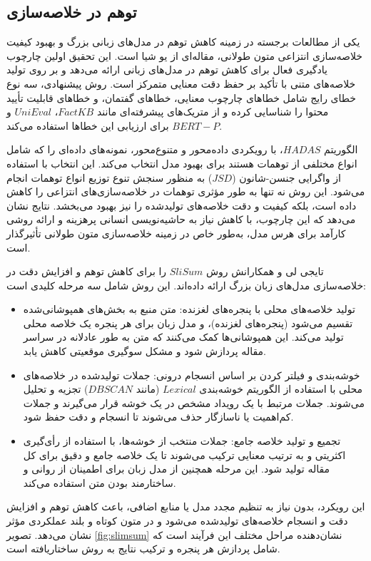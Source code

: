 \subsection{توهم در خلاصه‌سازی}
یکی از مطالعات برجسته در زمینه کاهش توهم در مدل‌های زبانی بزرگ  و بهبود کیفیت خلاصه‌سازی انتزاعی متون طولانی، مقاله‌ای از یو شیا است. این تحقیق اولین چارچوب یادگیری فعال برای کاهش توهم در مدل‌های زبانی ارائه می‌دهد و بر روی تولید خلاصه‌های متنی با تأکید بر حفظ دقت معنایی متمرکز است. روش پیشنهادی، سه نوع خطای رایج شامل خطاهای چارچوب معنایی، خطاهای گفتمان، و خطاهای قابلیت تأیید محتوا را شناسایی کرده و از متریک‌های پیشرفته‌ای مانند $FactKB$، $UniEval$ و$ BERT-P$ برای ارزیابی این خطاها استفاده می‌کند.

الگوریتم $HADAS$، با رویکردی داده‌محور و متنوع‌محور، نمونه‌های داده‌ای را که شامل انواع مختلفی از توهمات هستند برای بهبود مدل انتخاب می‌کند. این انتخاب با استفاده از واگرایی جنسن-شانون ($JSD$) به منظور سنجش تنوع توزیع انواع توهمات انجام می‌شود. این روش نه تنها به طور مؤثری توهمات در خلاصه‌سازی‌های انتزاعی را کاهش داده است، بلکه کیفیت و دقت خلاصه‌های تولیدشده را نیز بهبود می‌بخشد. نتایج نشان می‌دهد که این چارچوب، با کاهش نیاز به حاشیه‌نویسی انسانی پرهزینه و ارائه روشی کارآمد برای هرس مدل، به‌طور خاص در زمینه خلاصه‌سازی متون طولانی تأثیرگذار است\cite{xia2024hallucinationdiversityawareactivelearning}.


 تایجی لی و همکارانش روش $SliSum$ را برای کاهش توهم و افزایش دقت در خلاصه‌سازی مدل‌های زبان بزرگ ارائه داده‌اند. این روش شامل سه مرحله کلیدی است:
\begin{itemize}
	\item 
تولید خلاصه‌های محلی با پنجره‌های لغزنده: متن منبع به بخش‌های همپوشانی‌شده تقسیم می‌شود (پنجره‌های لغزنده)، و مدل زبان برای هر پنجره یک خلاصه محلی تولید می‌کند. این همپوشانی‌ها کمک می‌کنند که متن به طور عادلانه در سراسر مقاله پردازش شود و مشکل سوگیری موقعیتی کاهش یابد.
\item 
خوشه‌بندی و فیلتر کردن بر اساس انسجام درونی: جملات تولیدشده در خلاصه‌های محلی با استفاده از الگوریتم خوشه‌بندی $Lexical$ (مانند $DBSCAN$) تجزیه و تحلیل می‌شوند. جملات مرتبط با یک رویداد مشخص در یک خوشه قرار می‌گیرند و جملات کم‌اهمیت یا ناسازگار حذف می‌شوند تا انسجام و دقت حفظ شود.
\item 
تجمیع و تولید خلاصه جامع: جملات منتخب از خوشه‌ها، با استفاده از رأی‌گیری اکثریتی و به ترتیب معنایی ترکیب می‌شوند تا یک خلاصه جامع و دقیق برای کل مقاله تولید شود. این مرحله همچنین از مدل زبان برای اطمینان از روانی و ساختارمند بودن متن استفاده می‌کند.
\end{itemize}
این رویکرد، بدون نیاز به تنظیم مجدد مدل یا منابع اضافی، باعث کاهش توهم و افزایش دقت و انسجام خلاصه‌های تولیدشده می‌شود و در متون کوتاه و بلند عملکردی مؤثر نشان می‌دهد. تصویر \ref{fig:slimsum} نشان‌دهنده مراحل مختلف این فرآیند است که شامل پردازش هر پنجره و ترکیب نتایج به روش ساختاریافته است\cite{li-etal-2024-improving-faithfulness}.

